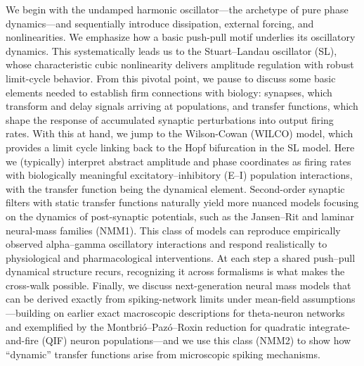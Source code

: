\documentclass[12pt]{article}
\numberwithin{equation}{section}
\newcommand{\rev}[1]{\begingroup\color{navyblue}#1\endgroup}
\begin{document}
 We begin with the undamped harmonic oscillator—the archetype of pure phase dynamics—and sequentially introduce dissipation, external forcing, and nonlinearities. We emphasize how a basic push-pull motif underlies its oscillatory dynamics.  This systematically leads us to the Stuart–Landau oscillator (SL), whose characteristic cubic nonlinearity delivers amplitude regulation with robust limit-cycle behavior. From this pivotal point, we pause to discuss some basic elements needed to establish firm connections with biology: synapses, which transform and delay signals arriving at populations, and transfer functions, which shape the response of accumulated synaptic perturbations into output firing rates. 
With this at hand, we jump to the Wilson-Cowan (WILCO) model, which provides a limit cycle linking back to the Hopf bifurcation in the SL model. Here we (typically) interpret abstract amplitude and phase coordinates as firing rates with biologically meaningful excitatory–inhibitory (E–I) population interactions, with the transfer function being the dynamical element. 
Second-order synaptic filters with static transfer functions naturally yield more nuanced models focusing on the dynamics of post-synaptic potentials, such as the Jansen–Rit and laminar neural-mass families (NMM1). This class of models can reproduce empirically observed alpha–gamma oscillatory interactions and respond realistically to physiological and pharmacological interventions.  \rev{At each step a shared push--pull dynamical structure recurs, recognizing it across formalisms is what makes the cross-walk possible.  Finally, we discuss next-generation neural mass models that can be derived exactly from spiking-network limits under mean-field assumptions—building on earlier exact macroscopic descriptions for theta-neuron networks and exemplified by the Montbrió–Pazó–Roxin reduction for quadratic integrate-and-fire (QIF) neuron  populations—and we use this class (NMM2) to show how “dynamic” transfer functions arise from microscopic spiking mechanisms. \cite{Montbrio:2015aa,so2014networks,luke2013complete}}
 
\end{document}
